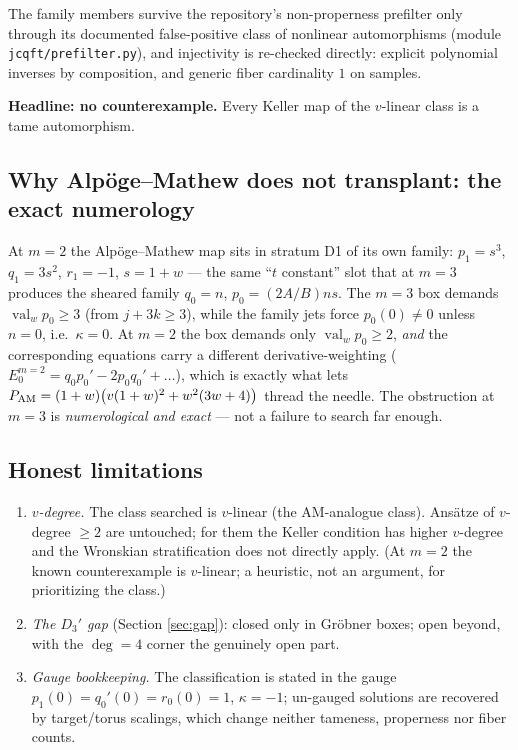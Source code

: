 \documentclass[11pt]{article}
\theoremstyle{definition}
\theoremstyle{remark}
\newcommand{\val}{\operatorname{val}}
\begin{document}
The family members survive the repository's non-properness prefilter
only through its documented false-positive class of nonlinear
automorphisms (module \texttt{jcqft/prefilter.py}), and injectivity is
re-checked directly: explicit polynomial inverses by composition, and
generic fiber cardinality $1$ on samples.

\textbf{Headline: no counterexample.} Every Keller map of the
$v$-linear class is a tame automorphism.

\subsection{Why Alp\"oge--Mathew does not transplant: the exact
numerology}\label{sec:numerology}

At $m=2$ the Alp\"oge--Mathew map sits in stratum D1 of its own family:
$p_1 = s^3$, $q_1 = 3s^2$, $r_1 = -1$, $s = 1+w$ --- the same
``$t$ constant'' slot that at $m=3$ produces the sheared family
$q_0 = n$, $p_0 = (2A/B)ns$. The $m=3$ box demands $\val_w p_0 \ge 3$
(from $j + 3k \ge 3$), while the family jets force $p_0(0) \ne 0$
unless $n = 0$, i.e.\ $\kappa = 0$. At $m=2$ the box demands only
$\val_w p_0 \ge 2$, \emph{and} the corresponding equations carry a
different derivative-weighting ($E_0^{m=2} = q_0p_0' - 2p_0q_0' +
\dots$), which is exactly what lets
$P_{\rm AM} = (1+w)\bigl(v(1+w)^2 + w^2(3w+4)\bigr)$ thread the needle.
The obstruction at $m=3$ is \emph{numerological and exact} --- not a
failure to search far enough.

\subsection{Honest limitations}

\begin{enumerate}
\item \emph{$v$-degree.} The class searched is $v$-linear (the
 AM-analogue class). Ans\"atze of $v$-degree $\ge 2$ are untouched;
 for them the Keller condition has higher $v$-degree and the Wronskian
 stratification does not directly apply. (At $m=2$ the known
 counterexample is $v$-linear; a heuristic, not an argument, for
 prioritizing the class.)
\item \emph{The $D_3'$ gap} (Section \ref{sec:gap}): closed only in
 Gr\"obner boxes; open beyond, with the $\deg = 4$ corner the
 genuinely open part.
\item \emph{Gauge bookkeeping.} The classification is stated in the
 gauge $p_1(0)=q_0'(0)=r_0(0)=1$, $\kappa=-1$; un-gauged solutions are
 recovered by target/torus scalings, which change neither tameness,
 properness nor fiber counts.
\end{enumerate}
\end{document}
